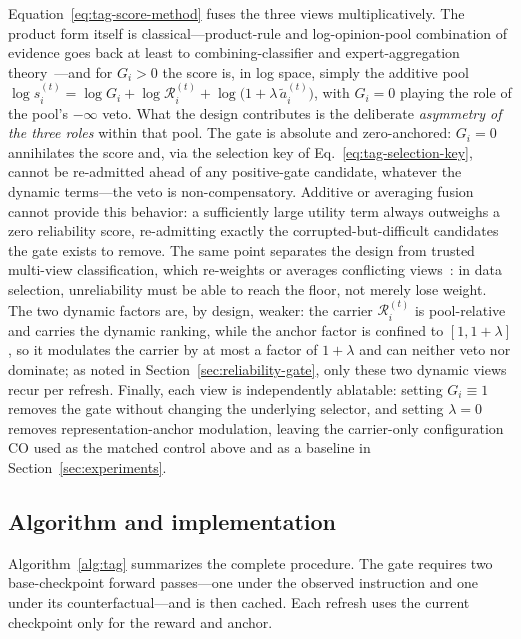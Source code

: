 Equation~\eqref{eq:tag-score-method} fuses the three views
multiplicatively. The product form itself is classical---product-rule
and log-opinion-pool combination of evidence goes back at least to
combining-classifier and expert-aggregation
theory~\cite{kittler1998combining,genest1986combining}---and for
\(G_i>0\) the score is, in log space, simply the additive pool
\(\log s_i^{(t)}=\log G_i+\log\mathcal R_i^{(t)}
+\log\bigl(1+\lambda\,\widetilde a_i^{(t)}\bigr)\), with
\(G_i=0\) playing the role of the pool's \(-\infty\) veto.
What the design contributes is the deliberate \emph{asymmetry of the
three roles} within that pool. The gate is absolute and
zero-anchored: \(G_i=0\) annihilates the score and, via the
selection key of Eq.~\eqref{eq:tag-selection-key}, cannot be
re-admitted ahead of any positive-gate candidate, whatever the
dynamic terms---the veto is non-compensatory. Additive or
averaging fusion cannot provide this behavior: a sufficiently large
utility term always outweighs a zero reliability score,
re-admitting exactly the corrupted-but-difficult candidates the
gate exists to remove. The same point separates the design from
trusted multi-view classification, which re-weights or averages
conflicting views~\cite{tmc2021,rcml2024}: in data selection,
unreliability must be able to reach the floor, not merely lose
weight. The two dynamic factors are, by design, weaker: the carrier
\(\mathcal R_i^{(t)}\) is pool-relative and carries the dynamic
ranking, while the anchor factor is confined to
\([1,1+\lambda]\), so it modulates the carrier by at most a factor
of \(1{+}\lambda\) and can neither veto nor dominate; as noted in
Section~\ref{sec:reliability-gate}, only these two dynamic views
recur per refresh. Finally, each view is independently ablatable:
setting \(G_i\equiv 1\) removes the gate without changing the
underlying selector, and setting \(\lambda=0\) removes
representation-anchor modulation, leaving the carrier-only
configuration CO used as the matched control above and as a
baseline in Section~\ref{sec:experiments}.

\subsection{Algorithm and implementation}
\label{sec:algorithm-implementation}

Algorithm~\ref{alg:tag} summarizes the complete procedure. The gate
requires two base-checkpoint forward passes---one under the observed
instruction and one under its counterfactual---and is then cached. Each
refresh uses the current checkpoint only for the reward and anchor.

